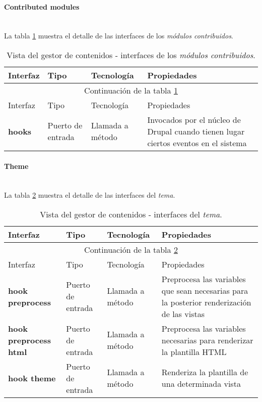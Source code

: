 \paragraph{Contributed modules} \hfill \\
La tabla \ref{interfaces_cms_modules} muestra el detalle de las interfaces de los \textit{módulos contribuidos}.  

\begin{longtable}[c]{|p{25mm}|p{20mm}|p{30mm}|p{60mm}|}
	\caption{Vista del gestor de contenidos - interfaces de los \textit{módulos contribuidos}.\label{interfaces_cms_modules}}\\
		\hline
			Interfaz & Tipo & Tecnología & Propiedades\\
		\hline
		\hline
	\endfirsthead
		\hline
		\multicolumn{4}{|c|}{Continuación de la tabla \ref{interfaces_cms_modules}}\\
		\hline
			Interfaz & Tipo & Tecnología & Propiedades\\
		\hline
		\hline
	\endhead
	\hline
	\endfoot
		\textbf{hooks} & Puerto de entrada & Llamada a método & Invocados por el núcleo de Drupal cuando tienen lugar ciertos eventos en el sistema \\
	\hline
	\hline
\end{longtable}


\paragraph{Theme} \hfill \\
La tabla \ref{interfaces_cms_theme} muestra el detalle de las interfaces del \textit{tema}.  

\begin{longtable}[c]{|p{25mm}|p{20mm}|p{30mm}|p{60mm}|}
	\caption{Vista del gestor de contenidos - interfaces del \textit{tema}.\label{interfaces_cms_theme}}\\
		\hline
			Interfaz & Tipo & Tecnología & Propiedades\\
		\hline
		\hline
	\endfirsthead
		\hline
		\multicolumn{4}{|c|}{Continuación de la tabla \ref{interfaces_cms_theme}}\\
		\hline
			Interfaz & Tipo & Tecnología & Propiedades\\
		\hline
		\hline
	\endhead
	\hline
	\endfoot
		\textbf{hook preprocess} & Puerto de entrada & Llamada a método & Preprocesa las variables que sean necesarias para la posterior renderización de las vistas \\
		\hline
			
		\textbf{hook preprocess html} & Puerto de entrada & Llamada a método & Preprocesa las variables necesarias para renderizar la plantilla HTML \\
		\hline
			
		\textbf{hook theme} & Puerto de entrada & Llamada a método & Renderiza la plantilla de una determinada vista \\
	\hline
	\hline
\end{longtable}


